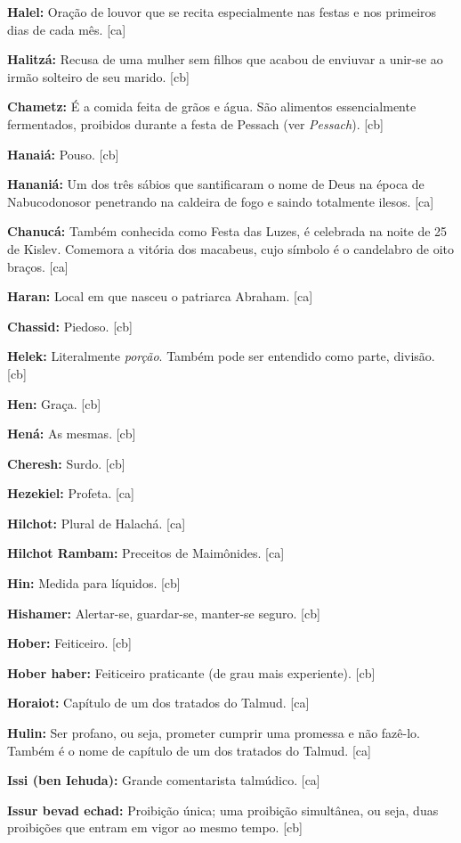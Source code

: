 \textbf{Halel:} Oração de louvor que se recita especialmente nas
festas e nos primeiros dias de cada mês. [ca]

\textbf{Halitzá:} Recusa de uma mulher sem filhos que acabou de
enviuvar a unir-se ao irmão solteiro de seu marido. [cb]

\textbf{Chametz:} É a comida feita de grãos e água. São alimentos 
essencialmente fermentados, proibidos durante a festa 
de Pessach (ver \emph{Pessach}). [cb]

\textbf{Hanaiá:} Pouso. [cb]

\textbf{Hananiá:} Um dos três sábios que santificaram o nome de Deus
na época de Nabucodonosor penetrando na caldeira de fogo e saindo
totalmente ilesos. [ca]

\textbf{Chanucá:} Também conhecida como Festa das Luzes, é celebrada 
na noite de 25 de Kislev. Comemora a vitória dos macabeus, 
cujo símbolo é o candelabro de oito braços. [ca]

\textbf{Haran:} Local em que nasceu o patriarca Abraham. [ca]

\textbf{Chassid:} Piedoso. [cb]

\textbf{Helek:} Literalmente \emph{porção}. Também pode ser 
entendido como parte, divisão. [cb]

\textbf{Hen:} Graça. [cb]

\textbf{Hená:} As mesmas. [cb]

\textbf{Cheresh:} Surdo. [cb]

\textbf{Hezekiel:} Profeta. [ca]

\textbf{Hilchot:} Plural de Halachá. [ca]

\textbf{Hilchot Rambam:} Preceitos de Maimônides. [ca]

\textbf{Hin:} Medida para líquidos. [cb]

\textbf{Hishamer:} Alertar-se, guardar-se, manter-se seguro. [cb]

\textbf{Hober:} Feiticeiro. [cb]

\textbf{Hober haber:} Feiticeiro praticante (de grau mais experiente). [cb]

\textbf{Horaiot:} Capítulo de um dos tratados do Talmud. [ca]

\textbf{Hulin:} Ser profano, ou seja, prometer cumprir uma promessa e
não fazê-lo. Também é o nome de capítulo de um dos tratados do Talmud. [ca]

\textbf{Issi (ben Iehuda):} Grande comentarista talmúdico. [ca]

\textbf{Issur bevad echad:} Proibição única; uma proibição simultânea, ou seja, duas proibições que entram em vigor ao mesmo tempo. [cb]

